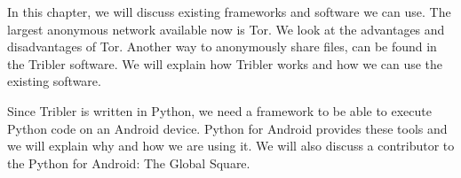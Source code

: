 In this chapter, we will discuss existing frameworks and software we can use. The largest anonymous network available now is Tor. We look at the advantages and disadvantages of Tor. Another way to anonymously share files, can be found in the Tribler software. We will explain how Tribler works and how we can use the existing software.
	
Since Tribler is written in Python, we need a framework to be able to execute Python code on an Android device. Python for Android provides these tools and we will explain why and how we are using it. We will also discuss a contributor to the Python for Android: The Global Square.
